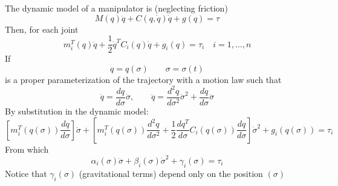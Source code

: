\documentclass{book}
\begin{document}
The dynamic model of a manipulator is (neglecting friction)
\[
    M(q)\ddot{q} +C(q,\dot{q})\dot{q}+g(q)=\tau
\]
Then, for each joint 
\[
    m_i^T(q)\ddot{q}+\displaystyle\frac{1}{2}\dot{q}^TC_i(q)\dot{q}+g_i(q)=\tau_i \quad i=1,\dots,n
\]
If 
\[
    q=q(\sigma) \qquad \sigma=\sigma(t)
\]
is a proper parameterization of the trajectory with a motion law such that 
\[
    \dot{q}=\displaystyle\frac{dq}{d\sigma}\dot{\sigma}, \qquad \ddot{q}=\displaystyle\frac{d^2q}{d\sigma^2}\dot{\sigma}^2 + \displaystyle\frac{dq}{d\sigma}\ddot{\sigma}
\]
By substitution in the dynamic model: 
\[
\left[m_i^T(q(\sigma))\displaystyle\frac{dq}{d\sigma}\right] \ddot{\sigma}+\left[m_i^T(q(\sigma))\displaystyle\frac{d^2q}{d\sigma^2}+\displaystyle\frac{1}{2}\displaystyle\frac{dq^T}{d\sigma}C_i(q(\sigma))\displaystyle\frac{dq}{d\sigma}\right]\dot{\sigma}^2+g_i(q(\sigma))=\tau_i
\]
From which 
\[
    \alpha_i(\sigma)\ddot{\sigma}+\beta_i(\sigma)\dot{\sigma}^2+\gamma_i(\sigma)=\tau_i
\]
Notice that $\gamma_i(\sigma)$ (gravitational terms) depend only on the position $(\sigma)$
\end{document}
